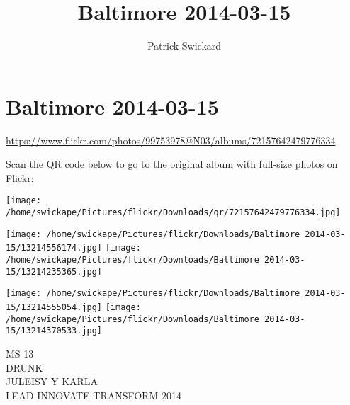 \documentclass[10pt,letterpaper]{article}
\title{Baltimore 2014-03-15}
\author{Patrick Swickard}
\date{}
\begin{document}
\section*{Baltimore 2014-03-15}

\url{https://www.flickr.com/photos/99753978@N03/albums/72157642479776334}

Scan the QR code below to go to the original album with full-size photos on Flickr:

\texttt{[image: /home/swickape/Pictures/flickr/Downloads/qr/72157642479776334.jpg]}
\pagebreak

\texttt{[image: /home/swickape/Pictures/flickr/Downloads/Baltimore 2014-03-15/13214556174.jpg]}
\texttt{[image: /home/swickape/Pictures/flickr/Downloads/Baltimore 2014-03-15/13214235365.jpg]}

\texttt{[image: /home/swickape/Pictures/flickr/Downloads/Baltimore 2014-03-15/13214555054.jpg]}
\texttt{[image: /home/swickape/Pictures/flickr/Downloads/Baltimore 2014-03-15/13214370533.jpg]}

MS{-}13\\
DRUNK\\
JULEISY Y KARLA\\
LEAD INNOVATE TRANSFORM 2014
\pagebreak
\end{document}

